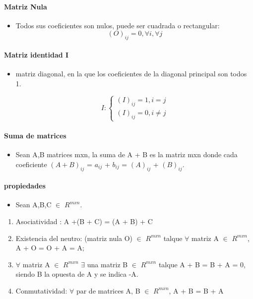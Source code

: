 \documentclass[a4paper]{article}
\begin{document}
\paragraph{Matriz Nula}
\begin{itemize}
	\item Todos sus coeficientes son nulos, puede ser	cuadrada o rectangular: 
	\begin{equation}
	(O)_{ij} = 0, \forall i , \forall j
	\end{equation}
\end{itemize}

\paragraph{Matriz identidad I}
\begin{itemize}
\item matriz diagonal, en la que los coeficientes de la diagonal principal son todos 1.

\begin{equation}
	I : \begin{cases}
			(I)_{ij} = 1,  i = j \\
			(I)_{ij} = 0,  i \neq j		
		\end{cases}
\end{equation}
\end{itemize}

\paragraph{Suma de matrices}
\begin{itemize}
	\item Sean A,B matrices mxn, la suma de A + B es la matriz mxn donde cada coeficiente $(A + B)_{ij}$ = $a_{ij}$ + $b_{ij}$ = $(A)_{ij}$ + $(B)_{ij}$.
\end{itemize}

\paragraph{propiedades}
\begin{itemize}
	\item Sean A,B,C $\in$ $R^{mxn}$.
\end{itemize}

\begin{enumerate}
	\item Asociatividad : A +(B + C) = (A + B) + C
	\item Existencia del neutro: (matriz nula O) $\in$ $R^{mxn}$ talque $\forall$ matriz A $\in$ $R^{mxn}$, A + O = O + A = A;
	\item $\forall$ matriz A $\in$ $R^{mxn}$ $\exists$ una matriz B  $\in$ $R^{mxn}$ talque A + B = B + A = 0, siendo B la opuesta de A y se indica -A.
	\item Conmutatividad:  $\forall$ par de matrices A, B $\in$ $R^{mxn}$, A + B = B + A
\end{enumerate}
\end{document}
